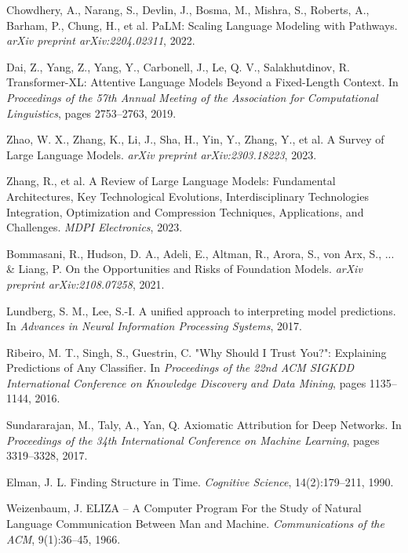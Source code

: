 \documentclass[conference]{IEEEtran}
\begin{document}
\begin{thebibliography}{999}
Chowdhery, A., Narang, S., Devlin, J., Bosma, M., Mishra, S., Roberts, A., Barham, P., Chung, H., et al.
\newblock PaLM: Scaling Language Modeling with Pathways.
\newblock \emph{arXiv preprint arXiv:2204.02311}, 2022.

Dai, Z., Yang, Z., Yang, Y., Carbonell, J., Le, Q. V., Salakhutdinov, R.
\newblock Transformer-XL: Attentive Language Models Beyond a Fixed-Length Context.
\newblock In \emph{Proceedings of the 57th Annual Meeting of the Association for Computational Linguistics}, pages 2753–2763, 2019.

Zhao, W. X., Zhang, K., Li, J., Sha, H., Yin, Y., Zhang, Y., et al.
\newblock A Survey of Large Language Models.
\newblock \emph{arXiv preprint arXiv:2303.18223}, 2023.

Zhang, R., et al.
\newblock A Review of Large Language Models: Fundamental Architectures, Key Technological Evolutions, Interdisciplinary Technologies Integration, Optimization and Compression Techniques, Applications, and Challenges.
\newblock \emph{MDPI Electronics}, 2023.

Bommasani, R., Hudson, D. A., Adeli, E., Altman, R., Arora, S., von Arx, S., ... \& Liang, P.
\newblock On the Opportunities and Risks of Foundation Models.
\newblock \emph{arXiv preprint arXiv:2108.07258}, 2021.

Lundberg, S. M., Lee, S.-I.
\newblock A unified approach to interpreting model predictions.
\newblock In \emph{Advances in Neural Information Processing Systems}, 2017.

Ribeiro, M. T., Singh, S., Guestrin, C.
\newblock "Why Should I Trust You?": Explaining Predictions of Any Classifier.
\newblock In \emph{Proceedings of the 22nd ACM SIGKDD International Conference on Knowledge Discovery and Data Mining}, pages 1135–1144, 2016.

Sundararajan, M., Taly, A., Yan, Q.
\newblock Axiomatic Attribution for Deep Networks.
\newblock In \emph{Proceedings of the 34th International Conference on Machine Learning}, pages 3319–3328, 2017.

Elman, J. L.
\newblock Finding Structure in Time.
\newblock \emph{Cognitive Science}, 14(2):179–211, 1990.

Weizenbaum, J.
\newblock ELIZA – A Computer Program For the Study of Natural Language Communication Between Man and Machine.
\newblock \emph{Communications of the ACM}, 9(1):36–45, 1966.


\end{thebibliography}
\end{document}
